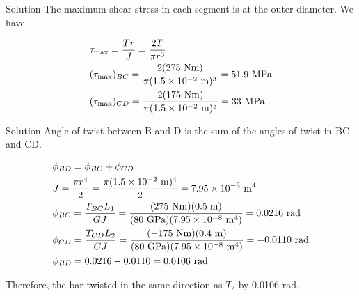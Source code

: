 \documentclass[10pt, svgnames]{beamer}
\begin{document}
\begin{frame}[label={sec:org3fec523}]{Solution}
The maximum shear stress in each segment is at the outer diameter. We have

\begin{gather*}
  \tau _{\max} = \frac{Tr}{J} = \frac{2T}{\pi {r^3}} \hfill \\
  ({\tau_{\max }})_{BC} = \frac{2(275\text{ Nm})}{\pi {(1.5 \times 10^{-2}\text{ m})^3}} = 51.9\text{ MPa} \hfill \\
  ({\tau _{\max }})_{CD} = \frac{2(175\text{ Nm})}{\pi (1.5 \times 10^{-2}\text{ m})^3} = 33\text{ MPa} \hfill
\end{gather*}
\end{frame}

\begin{frame}[label={sec:org108acb7}]{Solution}
Angle of twist between B and D is the sum of the angles of twist in BC and CD.

\begin{gather*}
  \phi_{BD} = \phi_{BC} + \phi_{CD} \hfill \\
  J = \frac{\pi r^4}{2} = \frac{\pi (1.5 \times 10^{-2}\text{ m})^4}{2} = 7.95 \times 10^{-8}\text{ m}^4 \hfill \\
  \phi_{BC} = \frac{T_{BC}L_1}{GJ} = \frac{( 275\text{ Nm})(0.5\;{\text{m}})}{(80\text{ GPa})(7.95 \times 10^{-8}\text{ m}^4)} =  0.0216\text{ rad} \hfill \\
  \phi_{CD} = \frac{T_{CD}L_2}{GJ} = \frac{(-175\text{ Nm})(0.4\text{ m})}{(80\text{ GPa})(7.95 \times 10^{-8}\text{ m}^4)} = -0.0110\text{ rad} \hfill \\
  \phi_{BD} =  0.0216 - 0.0110 =  0.0106\text{ rad} \hfill \\
\end{gather*}

Therefore, the bar twisted in the same direction as \(T_2\) by 0.0106
rad.
\end{frame}
\end{document}
